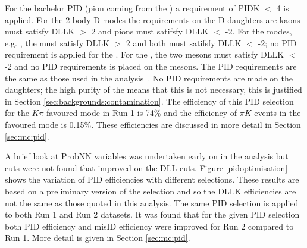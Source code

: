 For the bachelor PID (pion coming from the \Kstarm) a requirement of PIDK $<$ 4 is applied. For the 2-body D modes the requirements on the D daughters are kaons must satisfy DLLK $>$ 2 and pions must satifsfy DLLK $<$ -2. For the  modes, e.g. \decay{\Dz}{\Km\pip\pim\pip}, the \Km must satisfy DLLK $>$ 2 and both \pip must satifsfy DLLK $<$ -2; no PID requirement is applied for the \pip. For the \decay{\Dz}{\pip\pim\pip\pim}, the two \pip mesons must satisfy DLLK $<$ -2 and no PID requirements is placed on the \pim mesons. The PID requirements are the same as those used in the \decay{\Bp}{\D\Kp} analysis~\cite{LHCB-PAPER-2016-003}. No PID requirements are made on the \KS daughters; the high purity of the \KS means that this is not necessary, this is justified in Section \ref{sec:backgrounds:contamination}. The efficiency of this PID selection for the $K\pi$ favoured mode in Run 1 is 74\% and the efficiency of $\pi K$ events in the favoured mode is 0.15\%. These efficiencies are discussed in more detail in Section \ref{sec:mc:pid}. 


A brief look at ProbNN variables was undertaken early on in the analysis but cuts were not found that improved on the DLL cuts. Figure \ref{pidoptimisation} shows the variation of PID efficiencies with different selections. These results are based on a preliminary version of the selection and so the DLLK efficiencies are not the same as those quoted in this analysis.  The same PID selection is applied to both Run 1 and Run 2 datasets. It was found that for the given PID selection both PID efficiency and misID efficiency were improved for Run 2 compared to Run 1. More detail is given in Section \ref{sec:mc:pid}.

